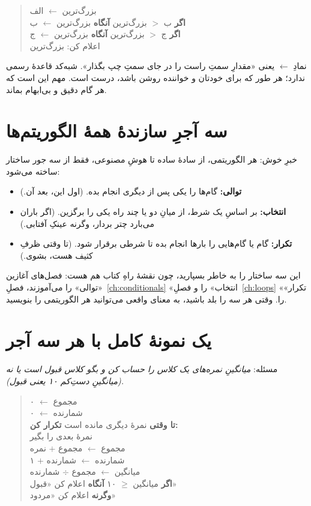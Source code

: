 \begin{quote}
بزرگ‌ترین $\leftarrow$ الف\\
\textbf{اگر} ب $>$ بزرگ‌ترین \textbf{آنگاه} بزرگ‌ترین $\leftarrow$ ب\\
\textbf{اگر} ج $>$ بزرگ‌ترین \textbf{آنگاه} بزرگ‌ترین $\leftarrow$ ج\\
اعلام کن: بزرگ‌ترین
\end{quote}

نمادِ $\leftarrow$ یعنی «مقدارِ سمتِ راست را در جای سمتِ چپ بگذار». شبه‌کد
قاعدهٔ رسمی ندارد؛ هر طور که برای خودتان و خواننده روشن باشد، درست است.
مهم این است که هر گام دقیق و بی‌ابهام بماند.

\section{سه آجرِ سازندهٔ همهٔ الگوریتم‌ها}

خبرِ خوش: هر الگوریتمی، از سادهٔ ساده تا هوشِ مصنوعی، فقط از سه جور ساختار
ساخته می‌شود:

\begin{itemize}
  \item \textbf{توالی:} گام‌ها را یکی پس از دیگری انجام بده. (اول این، بعد
        آن.)
  \item \textbf{انتخاب:} بر اساسِ یک شرط، از میانِ دو یا چند راه یکی را
        برگزین. (اگر باران می‌بارد چتر بردار، وگرنه عینکِ آفتابی.)
  \item \textbf{تکرار:} گام یا گام‌هایی را بارها انجام بده تا شرطی برقرار
        شود. (تا وقتی ظرفِ کثیف هست، بشوی.)
\end{itemize}

این سه ساختار را به خاطر بسپارید، چون نقشهٔ راهِ کتاب هم هست: فصل‌های آغازین
«توالی» را می‌آموزند، فصلِ~\ref{ch:conditionals} «انتخاب» را و فصلِ~\ref{ch:loops} «تکرار» را. وقتی هر سه را بلد باشید، به معنای واقعی می‌توانید
هر الگوریتمی را بنویسید.

\section{یک نمونهٔ کامل با هر سه آجر}

مسئله: \emph{میانگینِ نمره‌های یک کلاس را حساب کن و بگو کلاس قبول است یا
نه (میانگینِ دستِ‌کم ۱۰ یعنی قبول).}

\begin{quote}
مجموع $\leftarrow$ ۰\\
شمارنده $\leftarrow$ ۰\\
\textbf{تا وقتی} نمرهٔ دیگری مانده است \textbf{تکرار کن:}\\
\hspace*{2em} نمرهٔ بعدی را بگیر\\
\hspace*{2em} مجموع $\leftarrow$ مجموع $+$ نمره\\
\hspace*{2em} شمارنده $\leftarrow$ شمارنده $+$ ۱\\
میانگین $\leftarrow$ مجموع $\div$ شمارنده\\
\textbf{اگر} میانگین $\geq$ ۱۰ \textbf{آنگاه} اعلام کن «قبول»\\
\textbf{وگرنه} اعلام کن «مردود»
\end{quote}

